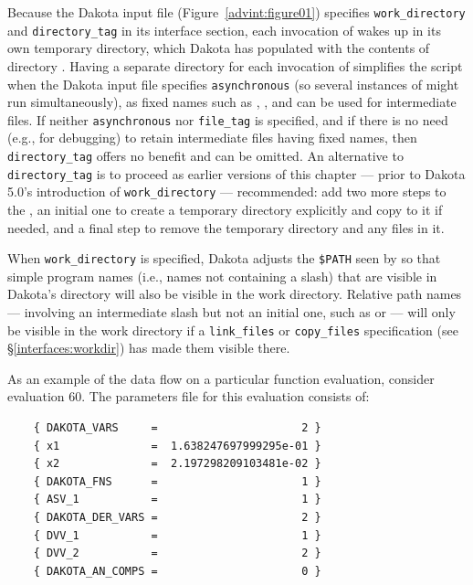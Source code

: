 
Because the Dakota input file 
(Figure~\ref{advint:figure01}) specifies
\texttt{work\_directory} and \texttt{directory\_tag} in its interface
section, each invocation of  wakes up in
its own temporary directory, which Dakota has populated with the
contents of directory . Having a separate directory
for each invocation of  simplifies the script
when the Dakota input file specifies \texttt{asynchronous} (so
several instances of  might run simultaneously),
as fixed names such as , , and 
can be used for intermediate files. If neither \texttt{asynchronous} nor
\texttt{file\_tag} is specified, and if there is no need (e.g., for debugging)
to retain intermediate files having fixed names, then \texttt{directory\_tag}
offers no benefit and can be omitted. An alternative to \texttt{directory\_tag}
is to proceed as earlier versions of this chapter --- prior to Dakota 5.0's
introduction of \texttt{work\_directory} --- recommended:  add two more
steps to the ,
an initial one to create a temporary directory explicitly and
copy  to it if needed, and a final step to remove the temporary
directory and any files in it.

When \texttt{work\_directory} is specified, Dakota adjusts the \texttt{\$PATH} seen
by  so that simple program names
(i.e., names not containing a slash) that
are visible in Dakota's directory will also be visible in the work directory.
Relative path names ---
involving an intermediate slash but not an initial one,
such as  or  ---
will only be visible in the work directory if a \texttt{link\_files}
or \texttt{copy\_files} specification (see \S\ref{interfaces:workdir})
has made them visible there.

As an example of the data flow on a particular function evaluation,
consider evaluation 60. The parameters file for this evaluation consists of:
\begin{small}
\begin{verbatim}
    { DAKOTA_VARS     =                      2 }
    { x1              =  1.638247697999295e-01 }
    { x2              =  2.197298209103481e-02 }
    { DAKOTA_FNS      =                      1 }
    { ASV_1           =                      1 }
    { DAKOTA_DER_VARS =                      2 }
    { DVV_1           =                      1 }
    { DVV_2           =                      2 }
    { DAKOTA_AN_COMPS =                      0 }
\end{verbatim}
\end{small}

